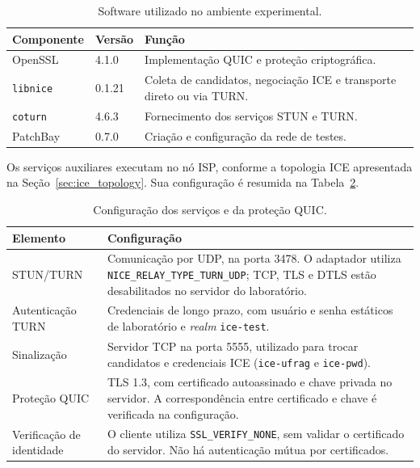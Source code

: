 \begin{table}[htbp]
    \centering
    \label{tab:experimental_software}
    \begin{tabular}{@{}p{}p{}p{}@{}}
        \toprule
        \textbf{Componente} & \textbf{Versão} & \textbf{Função} \\
        \midrule
        OpenSSL & 4.1.0 &
        Implementação QUIC e proteção criptográfica. \\
        \texttt{libnice} & 0.1.21 &
        Coleta de candidatos, negociação ICE e transporte
        direto ou via TURN. \\
        \texttt{coturn} & 4.6.3 &
        Fornecimento dos serviços STUN e TURN. \\
        PatchBay & 0.7.0 &
        Criação e configuração da rede de testes. \\
        \bottomrule
    \end{tabular}
    \caption{Software utilizado no ambiente experimental.}
\end{table}

Os serviços auxiliares executam no nó ISP, conforme a topologia ICE apresentada na Seção~\ref{sec:ice_topology}. Sua configuração é resumida na Tabela~\ref{tab:experimental_services}.

\begin{table}[htbp]
    \centering
    \label{tab:experimental_services}
    \begin{tabular}{@{}p{}p{}@{}}
        \toprule
        \textbf{Elemento} & \textbf{Configuração} \\
        \midrule
        STUN/TURN &
        Comunicação por UDP, na porta 3478.
        O adaptador utiliza
        \texttt{NICE\_RELAY\_TYPE\_TURN\_UDP};
        TCP, TLS e DTLS estão desabilitados no servidor
        do laboratório. \\
        Autenticação TURN &
        Credenciais de longo prazo, com usuário e senha
        estáticos de laboratório e \textit{realm}
        \texttt{ice-test}. \\
        Sinalização &
        Servidor TCP na porta 5555, utilizado para trocar
        candidatos e credenciais ICE
        (\texttt{ice-ufrag} e \texttt{ice-pwd}). \\
        Proteção QUIC &
        TLS 1.3, com certificado autoassinado e chave
        privada no servidor. A correspondência entre
        certificado e chave é verificada na configuração. \\
        Verificação de identidade &
        O cliente utiliza \texttt{SSL\_VERIFY\_NONE},
        sem validar o certificado do servidor.
        Não há autenticação mútua por certificados. \\
        \bottomrule
    \end{tabular}
    \caption{Configuração dos serviços e da proteção QUIC.}
\end{table}

